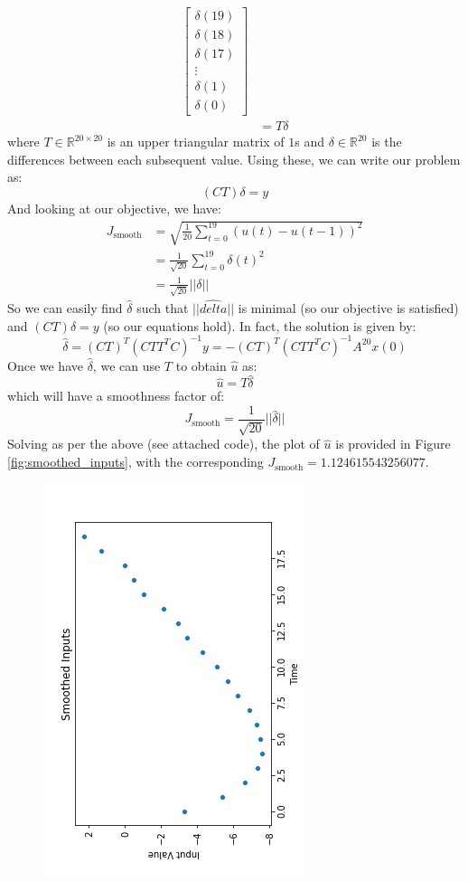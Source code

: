 \documentclass[12pt]{exam}
\begin{document}
\begin{questions}
\begin{solution}
\begin{enumerate}[label=(\alph*)]
\begin{align*}
\begin{bmatrix}
            \delta(19) \\
            \delta(18) \\
            \delta(17) \\
            \vdots \\
            \delta(1)\\
            \delta(0)
          \end{bmatrix} \\
          &= T\delta
      \end{align*}
      where $T \in \mathbb{R}^{20 \times 20}$ is an upper triangular matrix of $1$s and $\delta \in \mathbb{R}^{20}$ is the differences between each subsequent value. Using these, we can write our problem as:
      \[ 
        (CT)\delta = y
      \]
      And looking at our objective, we have:
      \begin{align*}
        J_{\text{smooth}} &= \sqrt{\frac{1}{20}\sum_{t=0}^{19} (u(t) - u(t-1))^2} \\
        &= \frac{1}{\sqrt{20}}\sum_{t=0}^{19} \delta(t)^2 \\
        &= \frac{1}{\sqrt{20}}|| \delta ||
      \end{align*}
      So we can easily find $\hat{\delta}$ such that $||\hat{delta}||$ is minimal (so our objective is satisfied) and $(CT)\delta = y$ (so our equations hold). In fact, the solution is given by:
      \[
        \hat{\delta} = (CT)^T(CTT^TC)^{-1}y = -(CT)^T(CTT^TC)^{-1}A^{20}x(0)
      \]
      Once we have $\hat{\delta}$, we can use $T$ to obtain $\hat{u}$ as:
      \[
        \hat{u} = T\hat{\delta}
      \]
      which will have a smoothness factor of:
      \[
        J_{\text{smooth}} = \frac{1}{\sqrt{20}}||\hat{\delta}||
      \]
      Solving as per the above (see attached code), the plot of $\hat{u}$ is provided in Figure \ref{fig:smoothed_inputs}, with the corresponding $J_{\text{smooth}} = 1.124615543256077$. 
    \end{enumerate}
  \end{solution}
  \afterpage{\clearpage}
  \begin{figure}
    \centering
    \includegraphics[scale=1.2]{smoothed_inputs.png}

\end{figure}
\end{questions}
\end{document}

